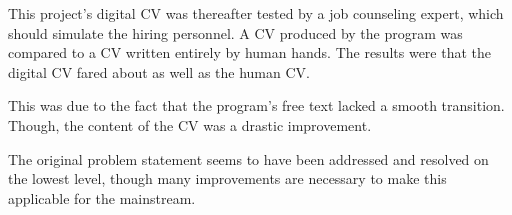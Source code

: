 This project’s digital CV was thereafter tested by a job counseling expert, which should simulate the hiring personnel. 
A CV produced by the program was compared to a CV written entirely by human hands.
The results were that the digital CV fared about as well as the human CV.

This was due to the fact that the program’s free text lacked a smooth transition. Though, the content of the CV was a drastic improvement.

The original problem statement seems to have been addressed and resolved on the lowest level, though many improvements are necessary to make this applicable for the mainstream.
\clearpage
